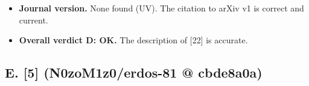 \documentclass[
]{article}
\providecommand{\tightlist}{%
  \setlength{\itemsep}{0pt}\setlength{\parskip}{0pt}}
\begin{document}
\begin{itemize}
  \begin{itemize}
  \tightlist
  \item
    {[}22{]}\textquotesingle s pinned representation is on the fixed
    tree T (Definition 2, p.9), so "enlarged class" with a
    path-preserving map is a correct description of a change.
  \item
    Lemma 11\textquotesingle s Claim 1 (gate set of size ≤ 3k built from
    leaves) is correctly identified as "not imported".
  \item
    Theorem 2 has m2 = 36k ln(max\textbar L\_u\textbar)ε\^{}\{-2\},
    matching "published logarithmic bounds".
  \item
    The manuscript\textquotesingle s m11 = ⌈2\^{}58(K+1)\^{}15/ε\^{}12⌉
    is larger than {[}22{]}\textquotesingle s. The manuscript says so
    (l.2300).
  \end{itemize}

  \textbf{OK}
\item
  \textbf{Journal version.} None found (UV). The citation to arXiv v1 is
  correct and current.
\item
  \textbf{Overall verdict D: OK.} The description of {[}22{]} is
  accurate.
\end{itemize}

\subsection{E. {[}5{]} (N0zoM1z0/erdos-81 @
cbde8a0a)}\label{e-5-n0zom1z0erdos-81--cbde8a0a}
\end{document}

